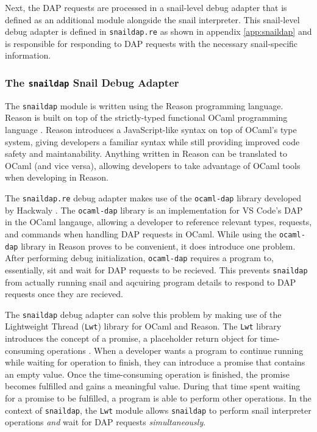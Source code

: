 \documentclass{article}
\begin{document}
Next, the DAP requests are processed in a snail-level debug adapter that is defined as an additional module alongside the snail interpreter. This snail-level debug adapter is defined in \lstinline{snaildap.re} as shown in appendix \ref{app:snaildap} and is responsible for responding to DAP requests with the necessary snail-specific information. 

\subsubsection{The \lstinline{snaildap} Snail Debug Adapter}

The \lstinline{snaildap} module is written using the Reason programming language. Reason is built on top of the strictly-typed functional OCaml programming language \cite{Reason_2020}. Reason introduces a JavaScript-like syntax on top of OCaml's type system, giving developers a familiar syntax while still providing improved code safety and maintanability. Anything written in Reason can be translated to OCaml (and vice versa), allowing developers to take advantage of OCaml tools when developing in Reason.

The \lstinline{snaildap.re} debug adapter makes use of the \lstinline{ocaml-dap} library developed by Hackwaly \cite{Hackwaly_2021}. The \lstinline{ocaml-dap} library is an implementation for VS Code's DAP in the OCaml langauge, allowing a developer to reference relevant types, requests, and commands when handling DAP requests in OCaml. While using the \lstinline{ocaml-dap} library in Reason proves to be convenient, it does introduce one problem. After performing debug initialization, \lstinline{ocaml-dap} requires a program to, essentially, sit and wait for DAP requests to be recieved. This prevents \lstinline{snaildap} from actually running snail and aqcuiring program details to respond to DAP requests once they are recieved. 

The \lstinline{snaildap} debug adapter can solve this problem by making use of the Lightweight Thread (\lstinline{Lwt}) library for OCaml and Reason. The \lstinline{Lwt} library introduces the concept of a promise, a placeholder return object for time-consuming operations \cite{Ocsigen_2023}. When a developer wants a program to continue running while waiting for operation to finish, they can introduce a promise that contains an empty value. Once the time-consuming operation is finished, the promise becomes fulfilled and gains a meaningful value. During that time spent waiting for a promise to be fulfilled, a program is able to perform other operations. In the context of \lstinline{snaildap}, the \lstinline{Lwt} module allows \lstinline{snaildap} to perform snail interpreter operations \emph{and} wait for DAP requests \emph{simultaneously}.
\end{document}
